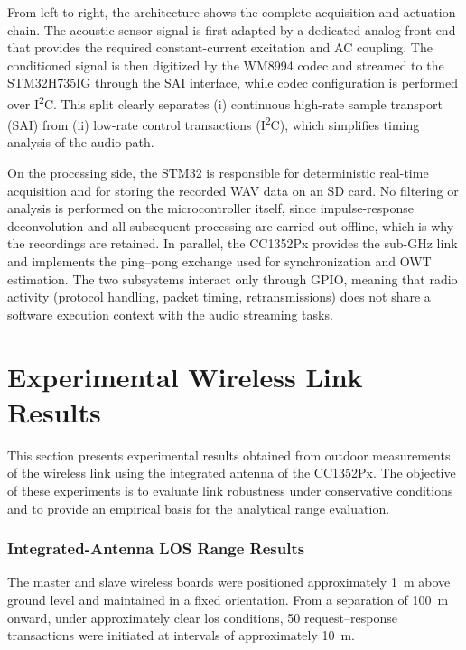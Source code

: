 From left to right, the architecture shows the complete acquisition and actuation chain. The acoustic sensor signal is first adapted by a dedicated analog front-end that provides the required constant-current excitation and AC coupling. The conditioned signal is then digitized by the WM8994 codec and streamed to the STM32H735IG through the SAI interface, while codec configuration is performed over I\textsuperscript{2}C. This split clearly separates (i) continuous high-rate sample transport (SAI) from (ii) low-rate control transactions (I\textsuperscript{2}C), which simplifies timing analysis of the audio path.

On the processing side, the STM32 is responsible for deterministic real-time acquisition and for storing the recorded WAV data on an SD card. No filtering or analysis is performed on the microcontroller itself, since impulse-response deconvolution and all subsequent processing are carried out offline, which is why the recordings are retained. In parallel, the CC1352Px provides the sub-GHz link and implements the ping--pong exchange used for synchronization and OWT estimation. The two subsystems interact only through GPIO, meaning that radio activity (protocol handling, packet timing, retransmissions) does not share a software execution context with the audio streaming tasks.



\section{Experimental Wireless Link Results}
\label{sec:results_rf_link}

This section presents experimental results obtained from outdoor  measurements of the wireless link using the integrated antenna of the CC1352Px. The objective of these experiments is to evaluate link robustness under conservative conditions and to provide an empirical basis for the analytical range evaluation.

\subsubsection{Integrated-Antenna LOS Range Results}

The master and slave wireless boards were positioned approximately 1~m above ground level and maintained in a fixed orientation. From a separation of 100~m onward, under approximately clear \acrshort{los} conditions, 50 request--response transactions were initiated at intervals of approximately 10~m.

